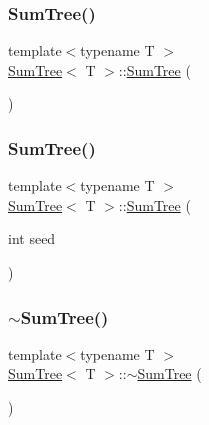 \subsubsection{\texorpdfstring{Sum\+Tree()}{SumTree()}\hspace{0.1cm}{\footnotesize\ttfamily [1/2]}}
{\footnotesize\ttfamily template$<$typename T $>$ \\
\hyperlink{class_sum_tree}{Sum\+Tree}$<$ T $>$\+::\hyperlink{class_sum_tree}{Sum\+Tree} (\begin{DoxyParamCaption}{ }\end{DoxyParamCaption})\hspace{0.3cm}{\ttfamily [inline]}}

\mbox{\label{class_sum_tree_ad2c193edab658df4c7c8ef84b66f34d1}} 
\subsubsection{\texorpdfstring{Sum\+Tree()}{SumTree()}\hspace{0.1cm}{\footnotesize\ttfamily [2/2]}}
{\footnotesize\ttfamily template$<$typename T $>$ \\
\hyperlink{class_sum_tree}{Sum\+Tree}$<$ T $>$\+::\hyperlink{class_sum_tree}{Sum\+Tree} (\begin{DoxyParamCaption}\item[{int}]{seed }\end{DoxyParamCaption})\hspace{0.3cm}{\ttfamily [inline]}}

\mbox{\label{class_sum_tree_a2b86f01e3bc3a732204b29550c54ef32}} 
\subsubsection{\texorpdfstring{$\sim$\+Sum\+Tree()}{~SumTree()}}
{\footnotesize\ttfamily template$<$typename T $>$ \\
\hyperlink{class_sum_tree}{Sum\+Tree}$<$ T $>$\+::$\sim$\hyperlink{class_sum_tree}{Sum\+Tree} (\begin{DoxyParamCaption}{ }\end{DoxyParamCaption})\hspace{0.3cm}{\ttfamily [inline]}}



